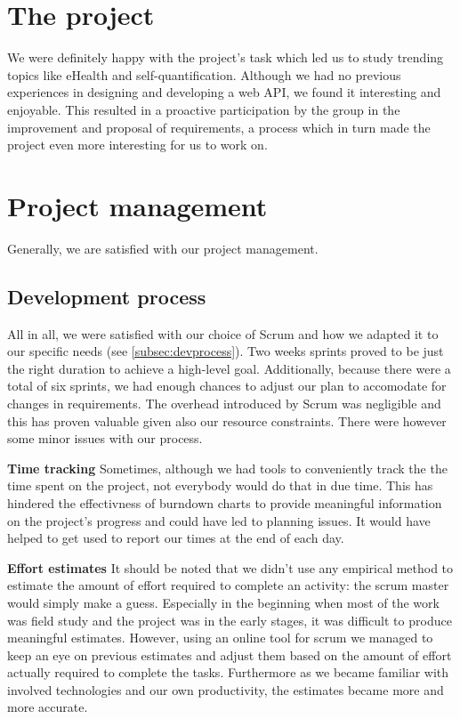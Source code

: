 \section{The project}
We were definitely happy with the project's task which led us to study trending topics
like eHealth and self-quantification. Although we had no previous experiences in designing and developing a web API,
we found it interesting and enjoyable. This resulted in a proactive participation by the group
in the improvement and proposal of requirements, a process which in turn made the project even more interesting
for us to work on.

\section{Project management}
Generally, we are satisfied with our project management.


\subsection{Development process}
All in all, we were satisfied with our choice of Scrum and how we adapted
it to our specific needs (see \ref{subsec:devprocess}).
Two weeks sprints proved to be just the right duration to achieve
a high-level goal. Additionally, because there were a total of six sprints,
we had enough chances to adjust our plan to accomodate for changes in requirements.
The overhead introduced by Scrum was negligible and this has proven valuable
given also our resource constraints. There were however some minor issues with our process.

\textbf{Time tracking}\newline
Sometimes, although we had tools to conveniently track the the time spent on the project,
not everybody would do that in due time. This has hindered the effectivness of burndown charts
to provide meaningful information on the project's progress and could have led to planning issues.
It would have helped to get used to report our times at the end of each day.

\textbf{Effort estimates}\newline
It should be noted that we didn't use any empirical method to estimate the amount of effort
required to complete an activity: the scrum master would simply make a guess.
Especially in the beginning when most of the work was field study and the project
was in the early stages, it was difficult to produce meaningful estimates.
However, using an online tool for scrum we managed to keep an eye on previous
estimates and adjust them based on the amount of effort actually required to complete the tasks.
Furthermore as we became familiar with involved technologies and our own productivity,
the estimates became more and more accurate.

